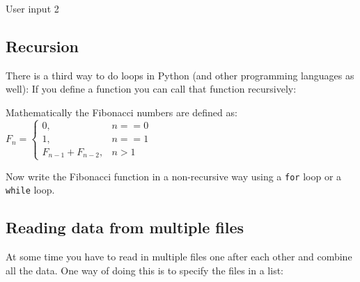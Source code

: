 \ifanswers
\begin{tcolorbox}[enhanced jigsaw,breakable,pad at break*=1mm,
    colback=blue!5!white,colframe=babyblueeyes,title=Solutions,
    watermark color=white]
    User input 2
    
\end{tcolorbox}
\fi

\subsection{Recursion}

There is a third way to do loops in Python (and other programming languages as well):
If you define a function you can call that function recursively: \\

\begin{tcolorbox}[enhanced jigsaw,breakable,pad at break*=1mm,
    colback=blue!5!white,colframe=babyblueeyes,title=Recursion with Fibonacci,
    watermark color=white]
    
\end{tcolorbox}

Mathematically the Fibonacci numbers are defined as: \\

\begin{math}
    F_{n} = \left\{
        \begin{array}{ll}
            0, & n == 0 \\
            1, & n == 1 \\
            F_{n-1} + F_{n-2}, & n > 1
        \end{array}
    \right.
\end{math}

Now write the Fibonacci function in a non-recursive way using a \verb|for| loop or a \verb|while| loop. \\

\ifanswers
\begin{tcolorbox}[enhanced jigsaw,breakable,pad at break*=1mm,
    colback=blue!5!white,colframe=babyblueeyes,title=Recursion with Fibonacci,
    watermark color=white]
    
\end{tcolorbox}
\fi

\subsection{Reading data from multiple files}
At some time you have to read in multiple files one after each other and combine all the data.
One way of doing this is to specify the files in a list: \\

